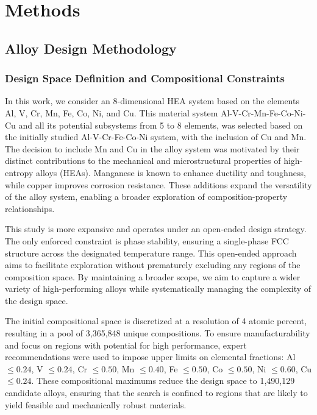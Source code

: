 \section{Methods}\label{sec:Material and methods}

\subsection{Alloy Design Methodology}

\subsubsection{Design Space Definition and Compositional Constraints}

In this work, we consider an 8-dimensional HEA system based on the elements Al, V, Cr, Mn, Fe, Co, Ni, and Cu. This material system Al-V-Cr-Mn-Fe-Co-Ni-Cu and all its potential subsystems from 5 to 8 elements, was selected based on the initially studied Al-V-Cr-Fe-Co-Ni system\cite{hastings2025acceleratedmultiobjectivealloydiscovery}, with the inclusion of Cu and Mn. The decision to include Mn and Cu in the alloy system was motivated by their distinct contributions to the mechanical and microstructural properties of high-entropy alloys (HEAs). Manganese is known to enhance ductility and toughness, while copper improves corrosion resistance. These additions expand the versatility of the alloy system, enabling a broader exploration of composition-property relationships. 

This study is more expansive and operates under an open-ended design strategy. The only enforced constraint is phase stability, ensuring a single-phase FCC structure across the designated temperature range. This open-ended approach aims to facilitate exploration without prematurely excluding any regions of the composition space. %
By maintaining a broader scope, we aim to capture a wider variety of high-performing alloys while systematically managing the complexity of the design space.

The initial compositional space is discretized at a resolution of 4 atomic percent, resulting in a pool of 3,365,848 unique compositions. To ensure manufacturability and focus on regions with potential for high performance, expert recommendations were used to impose upper limits on elemental fractions: Al $\leq 0.24$, V $\leq 0.24$, Cr $\leq 0.50$, Mn $\leq 0.40$, Fe $\leq 0.50$, Co $\leq 0.50$, Ni $\leq 0.60$, Cu $\leq 0.24$. These compositional maximums reduce the design space to 1,490,129 candidate alloys, ensuring that the search is confined to regions that are likely to yield feasible and mechanically robust materials. %

